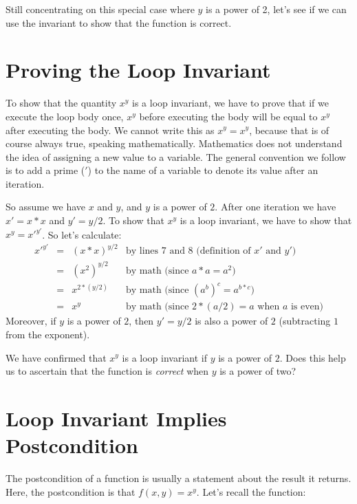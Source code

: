 Still concentrating on this special case where $y$ is a power of 2, let's
see if we can use the invariant to show that the function is correct.


\clearpage
\section{Proving the Loop Invariant}
\label{sec:contracts:proving}

To show that the quantity $x^y$ is a loop invariant, we have to prove
that if we execute the loop body once, $x^y$ before executing the body
will be equal to $x^y$ after executing the body.  We cannot write this
as $x^y = x^y$, because that is of course always true, speaking
mathematically.  Mathematics does not understand the idea of assigning
a new value to a variable.  The general convention we follow is to add
a prime (${}'$) to the name of a variable to denote its value after an
iteration.

So assume we have $x$ and $y$, and $y$ is a power of $2$.
After one iteration we have $x' = x * x$ and $y' = y / 2$.
To show that $x^y$ is a loop invariant, we have to show
that $x^y = {x'}^{y'}$.  So let's calculate:
$$
\begin{array}{lcll}
{x'}^{y'} &=& (x * x)^{y/2} & \mbox{by lines 7 and 8
                                    (definition of $x'$ and $y'$)}
\\        &=& (x^2)^{y/2}   & \mbox{by math (since $a*a = a^2$)}
\\        &=& x^{2*(y/2)}   & \mbox{by math (since $(a^b)^c = a^{b * c}$)}
\\        &=& x^y           & \mbox{by math (since $2*(a/2) = a$ when $a$ is even)}
\end{array}
$$
Moreover, if $y$ is a power of $2$, then $y' = y/2$ is
also a power of $2$ (subtracting $1$ from the exponent).

We have confirmed that $x^y$ is a loop invariant if $y$ is a power of
$2$.  Does this help us to ascertain that the function is
\emph{correct} when $y$ is a power of two?


\clearpage
\section{Loop Invariant Implies Postcondition}
\label{sec:contracts:proving_postcond}

The postcondition of a function is usually a statement about the
result it returns.  Here, the postcondition is that
$f(x,y) = x^y$.  Let's recall the function:

